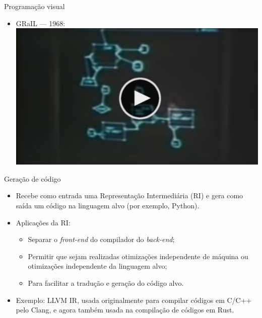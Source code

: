 \begin{frame}{Programação visual} 
    \begin{itemize}
        \item GRaIL — 1968:
        \href{https://www.youtube.com/watch?v=QQhVQ1UG6aM}{
            \includegraphics[width=\textwidth, height=\textheight, keepaspectratio=true]{beamerthemesrc/images/video-thumb.png}
        }
    \end{itemize}     
\end{frame}

\begin{frame}{Geração de código}
    \begin{itemize}
        \item Recebe como entrada uma Representação Intermediária (RI) e gera como saída um código na linguagem alvo (por exemplo, Python).
        \item Aplicações da RI: 
        \begin{itemize}
            \item Separar o \textit{front-end} do compilador do \textit{back-end};
            \item Permitir que sejam realizadas otimizações independente de máquina ou otimizações independente da linguagem alvo; 
            \item Para facilitar a tradução e geração do código alvo.
        \end{itemize}
        \item Exemplo: LLVM IR, usada originalmente para compilar códigos em C/C++ pelo Clang, e agora também usada na compilação de códigos em Rust.
    \end{itemize}    
\end{frame}

